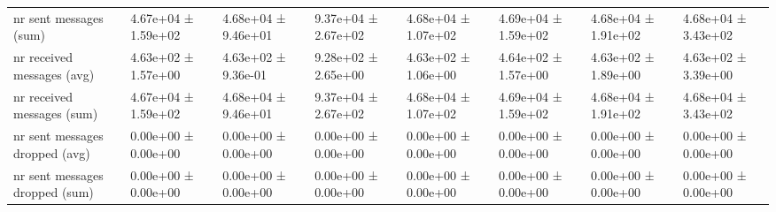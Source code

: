 \begin{tabular}{llllllll}
 nr sent messages (sum)             & 4.67e+04 ± 1.59e+02 & 4.68e+04 ± 9.46e+01 & 9.37e+04 ± 2.67e+02 & 4.68e+04 ± 1.07e+02 & 4.69e+04 ± 1.59e+02 & 4.68e+04 ± 1.91e+02 & 4.68e+04 ± 3.43e+02 \\
 nr received messages (avg)         & 4.63e+02 ± 1.57e+00 & 4.63e+02 ± 9.36e-01 & 9.28e+02 ± 2.65e+00 & 4.63e+02 ± 1.06e+00 & 4.64e+02 ± 1.57e+00 & 4.63e+02 ± 1.89e+00 & 4.63e+02 ± 3.39e+00 \\
 nr received messages (sum)         & 4.67e+04 ± 1.59e+02 & 4.68e+04 ± 9.46e+01 & 9.37e+04 ± 2.67e+02 & 4.68e+04 ± 1.07e+02 & 4.69e+04 ± 1.59e+02 & 4.68e+04 ± 1.91e+02 & 4.68e+04 ± 3.43e+02 \\
 nr sent messages dropped (avg)     & 0.00e+00 ± 0.00e+00 & 0.00e+00 ± 0.00e+00 & 0.00e+00 ± 0.00e+00 & 0.00e+00 ± 0.00e+00 & 0.00e+00 ± 0.00e+00 & 0.00e+00 ± 0.00e+00 & 0.00e+00 ± 0.00e+00 \\
 nr sent messages dropped (sum)     & 0.00e+00 ± 0.00e+00 & 0.00e+00 ± 0.00e+00 & 0.00e+00 ± 0.00e+00 & 0.00e+00 ± 0.00e+00 & 0.00e+00 ± 0.00e+00 & 0.00e+00 ± 0.00e+00 & 0.00e+00 ± 0.00e+00 \\
\hline
\end{tabular}
